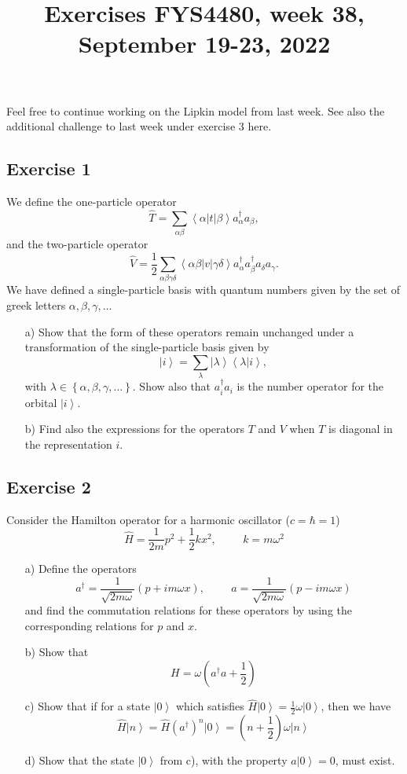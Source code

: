 \documentclass[prc]{revtex4}
\newcommand{\bra}[1]{\left\langle #1 \right|}
\newcommand{\ket}[1]{\left| #1 \right\rangle}
\begin{document}
\title{Exercises FYS4480, week 38, September 19-23, 2022}
\maketitle
Feel free to continue working on the Lipkin model from last week. See also the additional challenge to last week under exercise 3 here.

\subsection*{Exercise 1}
We define the one-particle operator
\[
\hat{T}={\displaystyle
\sum_{\alpha\beta}}\bra{\alpha}t\ket{\beta}a_{\alpha}^
{\dagger}a_{\beta},
\]
and the two-particle operator
\[
\hat{V}=
\frac{1}{2}{\displaystyle
\sum_{\alpha\beta\gamma\delta}}\bra{\alpha\beta}
v\ket{\gamma\delta}a_{\alpha}^{\dagger}a_{\beta}^{\dagger}
a_{\delta}a_{\gamma}.
\]
We have defined a single-particle basis with quantum numbers given by the set of greek letters $\alpha,\beta,\gamma,\dots$

\begin{enumerate}
\item[a)] Show that the form of these operators remain unchanged under 
a transformation  of the single-particle basis given by 
\[
\ket{i}=\sum_{\lambda}\ket{\lambda}\left\langle \lambda | i \right\rangle,
\]
with $\lambda\in \left\{\alpha,\beta,\gamma,\dots\right\}$. 
Show also that
$a_{i}^{\dagger}a_{i}$ is the number operator
for  the orbital $\ket{i}$. 
\item[b)] Find also the expressions for the operators
$T$ and $V$ when $T$ is diagonal in the representation
$i$. 
\end{enumerate}

\subsection*{Exercise 2}
Consider the Hamilton operator for a harmonic oscillator
($c=\hbar =1$)
\[
\hat{H}=\frac{1}{2m}p^{2}+\frac{1}{2}kx^{2},
\hspace{1cm}k=m\omega^{2}
\]
\begin{enumerate}
\item[a)] Define the operators
\[
a^{\dagger}=\frac{1}{\sqrt{2m\omega}}
(p+im\omega x),\hspace{1cm}a=\frac{1}{\sqrt{2m\omega}}
(p-im\omega x)
\]
and find the commutation relations for these operators by using the
corresponding relations for $p$ and $x$.
\item[b)] Show that
\[
H=\omega (a^{\dagger}a+\frac{1}{2})
\]
\item[c)] Show that if for a state $\ket{0}$ which satisfies
$\hat{H}\ket{0}=\frac{1}{2}\omega\ket{0}$, then we have
\[
\hat{H}\ket{n}=\hat{H}(a^{\dagger})^{n}\ket{0}=(n+\frac{1}{2})\omega\ket{n}
\]
\item[d)] Show that the state $\ket{0}$ from c), with the property
$a\ket{0}=0$, must exist.
\end{enumerate}
\end{document}
